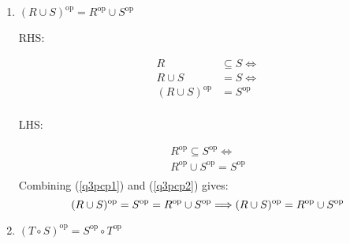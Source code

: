 \documentclass[10pt,\jkfside,a4paper]{article}
\begin{document}
\begin{enumerate}
\begin{enumerate}
\item $(R \cup S)^{\text{op}} = R^{\text{op}} \cup S^{\text{op}}$

\begin{center}
RHS:
\end{center}
\begin{equation}\label{q3pcp1}
\begin{split}
R &\subseteq S \Longleftrightarrow \\
R \cup S &= S \Longleftrightarrow \\
(R \cup S)^{\text{op}} &= S^{\text{op}} \\
\end{split}
\end{equation}
\begin{center}
LHS:
\end{center}
\begin{equation}\label{q3pcp2}
\begin{split}
R^{\text{op}} \subseteq S^{\text{op}} \Longleftrightarrow \\
R^{\text{op}} \cup S^{\text{op}} = S^{\text{op}} \\
\end{split}
\end{equation}
Combining (\ref{q3pcp1}) and (\ref{q3pcp2}) gives:
\begin{equation}
(R \cup S)^{\text{op}} = S^{\text{op}} = R^{\text{op}} \cup S^{\text{op}} \Longrightarrow \\
(R \cup S)^{\text{op}} = R^{\text{op}} \cup S^{\text{op}}\\
\end{equation}

\item $(T \circ S)^{\text{op}} = S^{\text{op}} \circ T^{\text{op}}$


\end{enumerate}
\end{enumerate}
\end{document}
